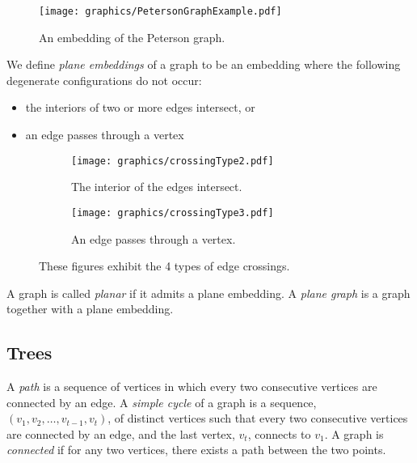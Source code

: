\begin{figure}[!htbp]
\begin{center}
\texttt{[image: graphics/PetersonGraphExample.pdf]}
\caption{An embedding of the Peterson graph.}\label{fig:graph1-1}
\end{center} 
\end{figure} 
We define \textit{plane embeddings} of a graph to be an embedding where the following degenerate 
configurations 
do not occur:
\begin{itemize}
\item[\rn{1}] the interiors of two or more edges intersect, or
\item[\rn{2}] an edge passes through a vertex
\end{itemize} 
\begin{figure}[H]
\begin{center}
  \begin{subfigure}[b]{0.49\textwidth}
	  \texttt{[image: graphics/crossingType2.pdf]}
	  \caption{The interior of the edges intersect.}
	  \label{fig:ch1-linkages-1-2}
  \end{subfigure}
  \begin{subfigure}[b]{0.49\textwidth}
	  \texttt{[image: graphics/crossingType3.pdf]}
	  \caption{An edge passes through a vertex.}
	  \label{fig:ch1-linkages-1-3}
  \end{subfigure}
\end{center} 
\caption{These figures exhibit the 4 types of edge crossings.}\label{fig:ch1-linkages-1}
\end{figure}
A graph is called \textit{planar} if it admits a plane embedding.  A \textit{plane graph} is a 
graph together with a plane embedding.
\subsection{Trees}
A \textit{path} is a sequence of vertices in which every two consecutive vertices are connected by 
an edge.   
A \textit{simple  cycle} of a graph is a sequence, $(v_1, v_2, \dots, v_{t-1},v_t)$, of 
distinct vertices such that every two consecutive vertices are connected by 
an edge,  and the last vertex, $v_t$, connects to $v_1$.  A 
graph is \textit{connected} if for any two vertices, there exists a path between 
the two points.

